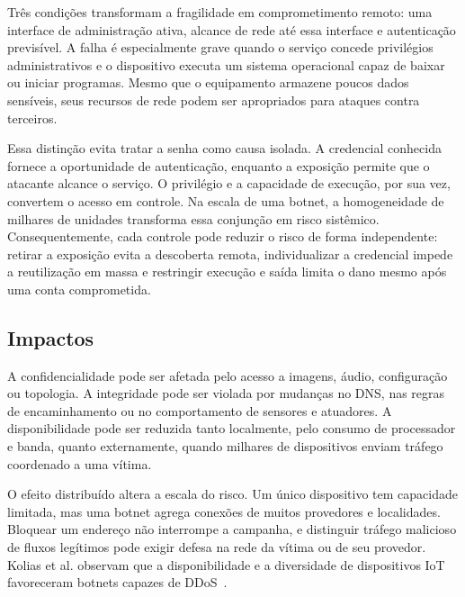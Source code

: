 \documentclass[11pt,a4paper]{article}
\begin{document}
Três condições transformam a fragilidade em comprometimento remoto: uma interface de administração ativa, alcance de rede até essa interface e autenticação previsível. A falha é especialmente grave quando o serviço concede privilégios administrativos e o dispositivo executa um sistema operacional capaz de baixar ou iniciar programas. Mesmo que o equipamento armazene poucos dados sensíveis, seus recursos de rede podem ser apropriados para ataques contra terceiros.

Essa distinção evita tratar a senha como causa isolada. A credencial conhecida fornece a oportunidade de autenticação, enquanto a exposição permite que o atacante alcance o serviço. O privilégio e a capacidade de execução, por sua vez, convertem o acesso em controle. Na escala de uma botnet, a homogeneidade de milhares de unidades transforma essa conjunção em risco sistêmico. Consequentemente, cada controle pode reduzir o risco de forma independente: retirar a exposição evita a descoberta remota, individualizar a credencial impede a reutilização em massa e restringir execução e saída limita o dano mesmo após uma conta comprometida.

\subsection{Impactos}
A confidencialidade pode ser afetada pelo acesso a imagens, áudio, configuração ou topologia. A integridade pode ser violada por mudanças no DNS, nas regras de encaminhamento ou no comportamento de sensores e atuadores. A disponibilidade pode ser reduzida tanto localmente, pelo consumo de processador e banda, quanto externamente, quando milhares de dispositivos enviam tráfego coordenado a uma vítima.

O efeito distribuído altera a escala do risco. Um único dispositivo tem capacidade limitada, mas uma botnet agrega conexões de muitos provedores e localidades. Bloquear um endereço não interrompe a campanha, e distinguir tráfego malicioso de fluxos legítimos pode exigir defesa na rede da vítima ou de seu provedor. Kolias et al. observam que a disponibilidade e a diversidade de dispositivos IoT favoreceram botnets capazes de DDoS~\cite{kolias2017}.
\end{document}
